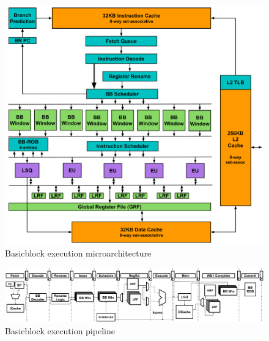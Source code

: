 \begin{figure}
	\centering
	\includegraphics[width=1.0\columnwidth]{fig/bb_architecture.pdf} 
	\caption{Basicblock execution microarchitecture}
	\label{fig:bb_arch}
\end{figure}


\begin{figure}
	\centering
	\includegraphics[width=\textwidth]{fig/pipeline.pdf} 
	\caption{Basicblock execution pipeline}
	\label{fig:pipeline}
\end{figure}




%



